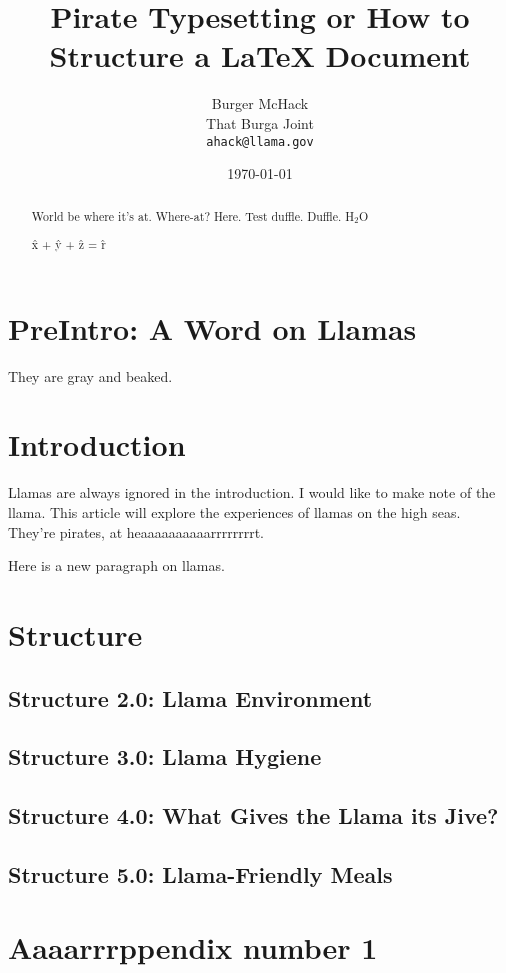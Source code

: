 \documentclass[10pt]{article}
\begin{document}
\title{\color{blue}Pirate Typesetting or How to Structure a \LaTeX{} Document}
\author{\color{red}Burger McHack  \\That Burga Joint \\ 
			\texttt{ahack@llama.gov}}
\date{\today}
\maketitle

\renewcommand{\abstractname}{Llama Abstracts are better than normal Abstracts}
\begin{abstract}
World be where it's at.
Where-at?
Here.
Test duffle.  Duf{}fle.
H$_2$O 

\^x + \^y + \^z = \^r
\end{abstract}
\tableofcontents
\listoffigures
\listoftables
\setcounter{tocdepth}{3} 
{}
\section*{PreIntro: A Word on Llamas}
They are gray and beaked.
\section{Introduction}
Llamas are always ignored in the introduction. I would like to make note of the llama. This article will explore the experiences of llamas on the high seas. They're pirates, at heaaaaaaaaaarrrrrrrrt.
	
	Here is a new paragraph on llamas.
	
\section{Structure}
\subsection{Structure 2.0: Llama Environment}
\subsection{Structure 3.0: Llama Hygiene}
\subsection{Structure 4.0: What Gives the Llama its Jive?}
\subsection{Structure 5.0: Llama-Friendly Meals}

\appendix
\section{Aaaarrrppendix number 1}
	
\end{document}
